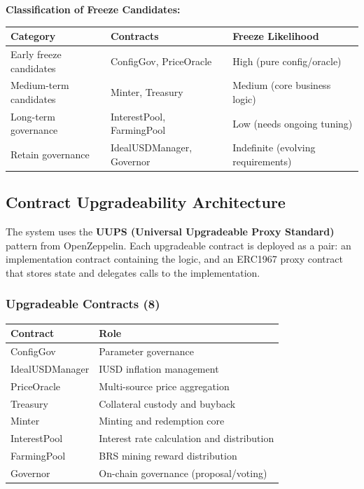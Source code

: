 \documentclass{article}
\begin{document}
\textbf{Classification of Freeze Candidates:}
\begin{center}
\begin{tabular}{lll}
\toprule
Category & Contracts & Freeze Likelihood \\
\midrule
Early freeze candidates & ConfigGov, PriceOracle & High (pure config/oracle) \\
Medium-term candidates & Minter, Treasury & Medium (core business logic) \\
Long-term governance & InterestPool, FarmingPool & Low (needs ongoing tuning) \\
Retain governance & IdealUSDManager, Governor & Indefinite (evolving requirements) \\
\bottomrule
\end{tabular}
\end{center}

\subsection{Contract Upgradeability Architecture}

The system uses the \textbf{UUPS (Universal Upgradeable Proxy Standard)} pattern from OpenZeppelin. Each upgradeable contract is deployed as a pair: an implementation contract containing the logic, and an ERC1967 proxy contract that stores state and delegates calls to the implementation.

\subsubsection{Upgradeable Contracts (8)}
\begin{center}
\begin{tabular}{ll}
\toprule
Contract & Role \\
\midrule
ConfigGov & Parameter governance \\
IdealUSDManager & IUSD inflation management \\
PriceOracle & Multi-source price aggregation \\
Treasury & Collateral custody and buyback \\
Minter & Minting and redemption core \\
InterestPool & Interest rate calculation and distribution \\
FarmingPool & BRS mining reward distribution \\
Governor & On-chain governance (proposal/voting) \\
\bottomrule
\end{tabular}
\end{center}
\end{document}
